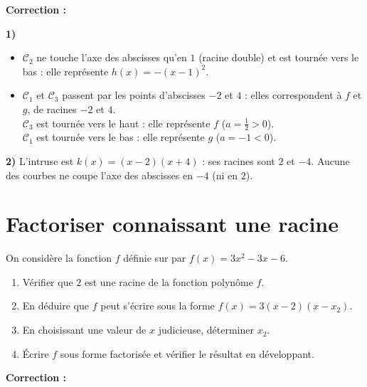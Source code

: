 \documentclass[11pt,a4paper]{book}
\begin{document}
\medskip
\noindent\textbf{\color{red!75!black}Correction :}

\smallskip
\begin{corrBox}
	\textbf{1)}
	\begin{itemize}
		\item $\mathcal{C}_2$ ne touche l'axe des abscisses qu'en $1$ (racine double) et est tournée vers le bas : elle représente $h(x)=-(x-1)^2$.
		\item $\mathcal{C}_1$ et $\mathcal{C}_3$ passent par les points d'abscisses $-2$ et $4$ : elles correspondent à $f$ et $g$, de racines $-2$ et $4$.\\
		$\mathcal{C}_3$ est tournée vers le haut : elle représente $f$ ($a=\frac12>0$).\\
		$\mathcal{C}_1$ est tournée vers le bas : elle représente $g$ ($a=-1<0$).
	\end{itemize}
\end{corrBox}

\medskip
\begin{corrBox}
	\textbf{2)} L'intruse est $k(x)=(x-2)(x+4)$ : ses racines sont $2$ et $-4$. Aucune des courbes ne coupe l'axe des abscisses en $-4$ (ni en $2$).
\end{corrBox}

\section*{\color{green!55!black}Factoriser connaissant une racine}

\exerciceDS{}

On considère la fonction $f$ définie sur \R par $f(x)=3x^2-3x-6$.

\begin{enumerate}[label=\textbf{\arabic*)}]
	\item Vérifier que $2$ est une racine de la fonction polynôme $f$.
	\item En déduire que $f$ peut s'écrire sous la forme $f(x)=3(x-2)(x-x_2)$.
	\item En choisissant une valeur de $x$ judicieuse, déterminer $x_2$.
	\item Écrire $f$ sous forme factorisée et vérifier le résultat en développant.
\end{enumerate}

\medskip
\noindent\textbf{\color{red!75!black}Correction :}
\end{document}

